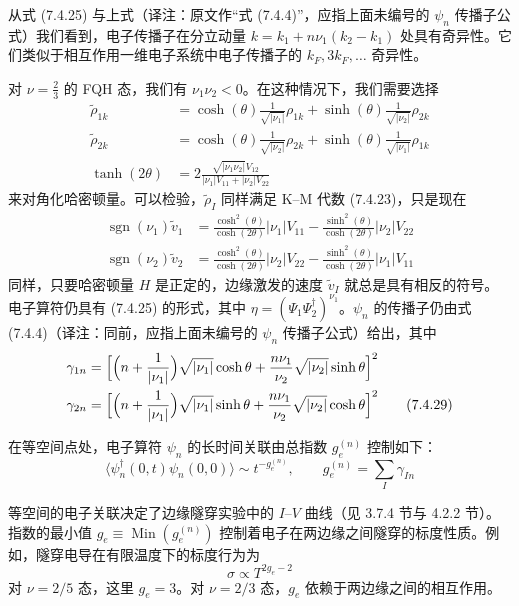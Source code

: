 从式 (7.4.25) 与上式（译注：原文作“式 (7.4.4)”，应指上面未编号的 $\psi_n$ 传播子公式）我们看到，电子传播子在分立动量 $k=k_1+n\nu_1(k_2-k_1)$ 处具有奇异性。它们类似于相互作用一维电子系统中电子传播子的 $k_F,3k_F,\ldots$ 奇异性。

对 $\nu=\frac{2}{3}$ 的 FQH 态，我们有 $\nu_1\nu_2<0$。在这种情况下，我们需要选择
\begin{align*}
\tilde{\rho}_{1k}&=\cosh(\theta)\frac{1}{\sqrt{|\nu_1|}}\rho_{1k}+\sinh(\theta)\frac{1}{\sqrt{|\nu_2|}}\rho_{2k}\\
\tilde{\rho}_{2k}&=\cosh(\theta)\frac{1}{\sqrt{|\nu_2|}}\rho_{2k}+\sinh(\theta)\frac{1}{\sqrt{|\nu_1|}}\rho_{1k}\\
\tanh(2\theta)&=2\frac{\sqrt{|\nu_1\nu_2|}V_{12}}{|\nu_1|V_{11}+|\nu_2|V_{22}}
\tag{7.4.27}
\end{align*}
来对角化哈密顿量。可以检验，$\tilde{\rho}_I$ 同样满足 K--M 代数 (7.4.23)，只是现在
\begin{align*}
\operatorname{sgn}(\nu_1)\tilde{v}_1&=\frac{\cosh^2(\theta)}{\cosh(2\theta)}|\nu_1|V_{11}-\frac{\sinh^2(\theta)}{\cosh(2\theta)}|\nu_2|V_{22}\\
\operatorname{sgn}(\nu_2)\tilde{v}_2&=\frac{\cosh^2(\theta)}{\cosh(2\theta)}|\nu_2|V_{22}-\frac{\sinh^2(\theta)}{\cosh(2\theta)}|\nu_1|V_{11}
\tag{7.4.28}
\end{align*}
同样，只要哈密顿量 $H$ 是正定的，边缘激发的速度 $\tilde{v}_I$ 就总是具有相反的符号。电子算符仍具有 (7.4.25) 的形式，其中 $\eta=(\Psi_1\Psi_2^\dagger)^{\nu_1}$。$\psi_n$ 的传播子仍由式 (7.4.4)（译注：同前，应指上面未编号的 $\psi_n$ 传播子公式）给出，其中
\begin{align*}
\gamma_{1n}&=\Bigl[\Bigl(n+\frac{1}{|\nu_1|}\Bigr)\sqrt{|\nu_1|}\cosh\theta+\frac{n\nu_1}{\nu_2}\sqrt{|\nu_2|}\sinh\theta\Bigr]^2\\
\gamma_{2n}&=\Bigl[\Bigl(n+\frac{1}{|\nu_1|}\Bigr)\sqrt{|\nu_1|}\sinh\theta+\frac{n\nu_1}{\nu_2}\sqrt{|\nu_2|}\cosh\theta\Bigr]^2
\tag{7.4.29}
\end{align*}

在等空间点处，电子算符 $\psi_n$ 的长时间关联由总指数 $g_e^{(n)}$ 控制如下：
\begin{equation*}
\langle\psi_n^\dagger(0,t)\psi_n(0,0)\rangle\sim t^{-g_e^{(n)}},\qquad g_e^{(n)}=\sum_I\gamma_{In}
\end{equation*}

等空间的电子关联决定了边缘隧穿实验中的 $I$--$V$ 曲线（见 3.7.4 节与 4.2.2 节）。指数的最小值 $g_e\equiv\operatorname{Min}(g_e^{(n)})$ 控制着电子在两边缘之间隧穿的标度性质。例如，隧穿电导在有限温度下的标度行为为
\begin{equation*}
\sigma\propto T^{2g_e-2}
\end{equation*}
对 $\nu=2/5$ 态，这里 $g_e=3$。对 $\nu=2/3$ 态，$g_e$ 依赖于两边缘之间的相互作用。

